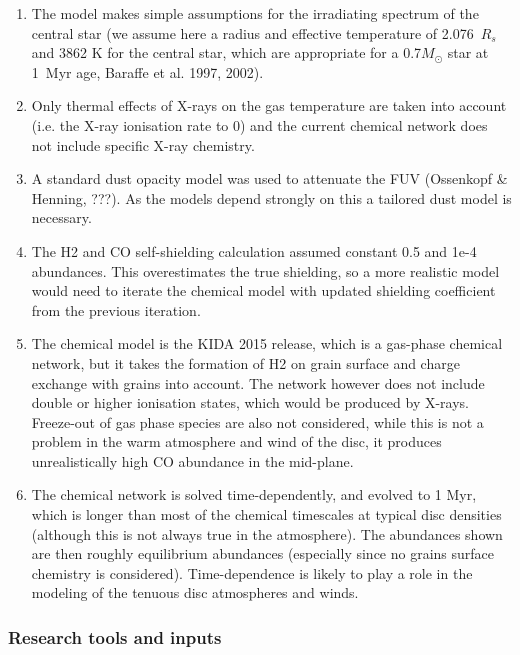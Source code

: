 \documentclass[10pt,fleqn,twoside]{article}
\begin{document}
\begin{enumerate}
\item The model makes simple assumptions for the irradiating spectrum
of the central star (we assume here a radius and effective temperature
of 2.076~$R_s$ and 3862 K for the central star, which are appropriate
for a 0.7$M_{\odot}$ star at 1~Myr age, Baraffe et al. 1997, 2002).

\item Only thermal effects of X-rays on the gas
temperature are taken into account (i.e. the X-ray ionisation rate
to 0) and the current chemical network does not include specific
X-ray chemistry. 

\item A standard dust opacity model was used to attenuate
the FUV (Ossenkopf \& Henning, ???). As the models depend strongly on
this a tailored dust model is necessary. 

\item The H2 and CO self-shielding
calculation assumed constant 0.5 and 1e-4 abundances. This overestimates the true
shielding, so a more realistic model would need to iterate the
chemical model with updated shielding coefficient from the previous
iteration.

\item The chemical model is the KIDA 2015 release, which is a gas-phase
chemical network, but it takes the formation of H2 on grain surface and
charge exchange with grains into account. The network however does not
include double or higher ionisation states, which would be produced by
X-rays. Freeze-out of gas phase species are also not considered, while
this is not a problem in the warm atmosphere and wind of the disc, it produces
unrealistically high CO abundance in the mid-plane. 

\item The chemical network is solved time-dependently, and evolved to 1 Myr,
which is longer than most of the chemical timescales at typical disc
densities (although this is not always true in the atmosphere). The
abundances shown are then roughly equilibrium abundances (especially since no
grains surface chemistry is considered). Time-dependence is likely to
play a role in the modeling of the tenuous disc atmospheres and
winds. 
\end{enumerate}

\subsubsection{Research tools and inputs}
\end{document}
